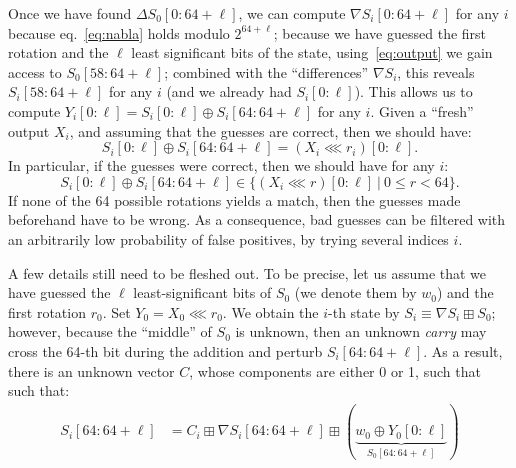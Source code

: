 \documentclass[journal=tosc,final]{iacrtrans}
\begin{document}
Once we have found $\Delta S_0[0:64+\ell]$, we can compute
$\nabla S_i[0:64+\ell]$ for any $i$ because eq.~\eqref{eq:nabla} holds modulo
$2^{64+\ell}$; because we have guessed the first rotation and the $\ell$ least
significant bits of the state, using~\eqref{eq:output} we gain access to
$S_0[58:64+\ell]$; combined with the ``differences'' $\nabla S_i$, this reveals
$S_i[58:64+\ell]$ for any $i$ (and we already had $S_i[0:\ell]$). This allows us
to compute $Y_i[0:\ell] = S_i[0:\ell] \oplus S_i[64:64+\ell]$ for any $i$. Given
a ``fresh'' output $X_i$, and assuming that the guesses are correct, then we
should have:
\begin{equation}\label{eq:find_rotation}
  S_i[0:\ell] \oplus S_i[64:64+\ell] = (X_i \lll r_i)[0:\ell].
\end{equation}
In particular, if the guesses were correct, then we should have for any $i$:
\begin{equation}\label{eq:consistency}
  S_i[0:\ell] \oplus S_i[64:64+\ell] \in \bigl\{ (X_i \lll r)[0:\ell]~|~0 \leq r < 64 \bigr\}.
\end{equation}
If none of the 64 possible rotations yields a match, then the guesses made
beforehand have to be wrong. As a consequence, bad guesses can be filtered with
an arbitrarily low probability of false positives, by trying several indices
$i$.

A few details still need to be fleshed out. To be precise, let us assume that we
have guessed the $\ell$ least-significant bits of $S_0$ (we denote them by
$w_0$) and the first rotation $r_0$. Set $Y_0 = X_0 \lll r_0$. %
We obtain the $i$-th state by $S_i \equiv \nabla S_i \boxplus S_0$; however,
because the ``middle'' of $S_0$ is unknown, then an unknown \emph{carry} may
cross the 64-th bit during the addition and perturb $S_i[64:64+\ell]$. As a
result, there is an unknown vector $C$, whose components are either 0 or 1, such
that such that:
\begin{align*}
  S_i[64:64+\ell] &= C_i \boxplus \nabla S_i[64:64+\ell] \boxplus (\underbrace{w_0 \oplus Y_0[0:\ell]}_{S_0[64:64+\ell]}) \\
\end{align*}
\end{document}
